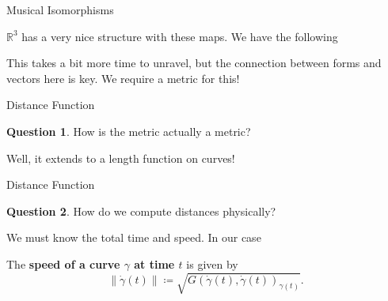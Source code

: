 \documentclass[usenames,dvipsnames]{beamer}
\theoremstyle{definition}
\newtheorem*{question}{Question}
\theoremstyle{theorem}
\newcommand{\R}{\mathbb{R}}
\begin{document}
	    \begin{frame}{Musical Isomorphisms}
	        \begin{example}
	            $\R^3$ has a very nice structure with these maps. We have the following
	            \begin{figure}[htbp]
            \label{fig:diagram}
            \end{figure}
            This takes a bit more time to unravel, but the connection between forms and vectors here is key. We require a metric for this!
	        \end{example}
	    \end{frame}

        \begin{frame}{Distance Function}
            \begin{question}
            How is the metric actually a metric?
            \end{question}
            \vspace*{0.5cm}
            Well, it extends to a length function on curves!
        \end{frame}
        
        \begin{frame}{Distance Function}
            \begin{question}
                How do we compute distances physically? 
            \end{question}
            \vspace*{0.5cm}
            We must know the total time and speed.  In our case
            \begin{definition}
                The \textbf{speed of a curve $\gamma$ at time $t$} is given by
                \[
                \|\dot{\gamma}(t)\|\coloneqq \sqrt{G(\dot{\gamma}(t),\dot{\gamma}(t))_{\gamma(t)}}.
                \]
            \end{definition}
        \end{frame}
        
\end{document}
